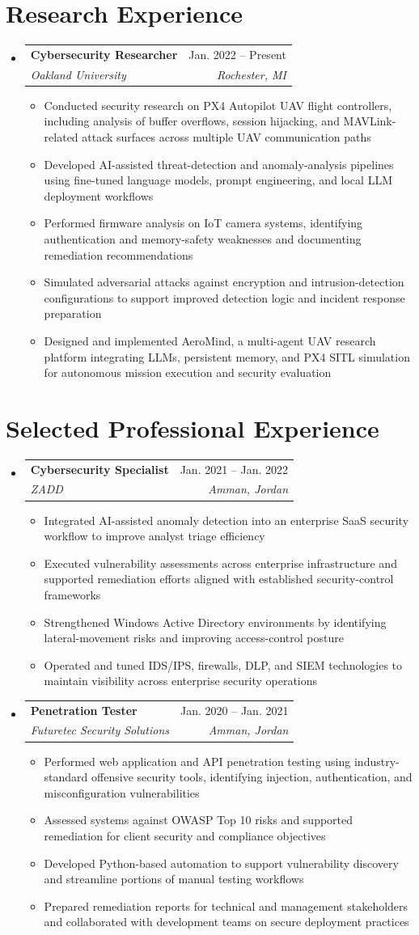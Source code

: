 \documentclass[letterpaper,11pt]{article}
\makeatletter
\newcommand{\resumeItem}[1]{
  \item\small{{#1 \vspace{-2pt}}}
}
\newcommand{\resumeSubheading}[4]{
  \vspace{-2pt}\item
    \begin{tabular*}{0.97\textwidth}[t]{l@{\extracolsep{\fill}}r}
      \textbf{#1} & #2 \\
      \textit{\small#3} & \textit{\small #4} \\
    \end{tabular*}\vspace{-7pt}
}
\newcommand{\resumeSubHeadingListStart}{\begin{itemize}[leftmargin=0.15in, label={}]}
\newcommand{\resumeSubHeadingListEnd}{\end{itemize}}
\newcommand{\resumeItemListStart}{\begin{itemize}}
\newcommand{\resumeItemListEnd}{\end{itemize}\vspace{-5pt}}
\makeatother
\begin{document}
\section{Research Experience}
\resumeSubHeadingListStart
\resumeSubheading
{Cybersecurity Researcher}{Jan. 2022 -- Present}
{Oakland University}{Rochester, MI}
\resumeItemListStart
\resumeItem{Conducted security research on PX4 Autopilot UAV flight controllers, including analysis of buffer overflows, session hijacking, and MAVLink-related attack surfaces across multiple UAV communication paths}
\resumeItem{Developed AI-assisted threat-detection and anomaly-analysis pipelines using fine-tuned language models, prompt engineering, and local LLM deployment workflows}
\resumeItem{Performed firmware analysis on IoT camera systems, identifying authentication and memory-safety weaknesses and documenting remediation recommendations}
\resumeItem{Simulated adversarial attacks against encryption and intrusion-detection configurations to support improved detection logic and incident response preparation}
\resumeItem{Designed and implemented AeroMind, a multi-agent UAV research platform integrating LLMs, persistent memory, and PX4 SITL simulation for autonomous mission execution and security evaluation}
\resumeItemListEnd
\resumeSubHeadingListEnd

\section{Selected Professional Experience}
\resumeSubHeadingListStart
\resumeSubheading
{Cybersecurity Specialist}{Jan. 2021 -- Jan. 2022}
{ZADD}{Amman, Jordan}
\resumeItemListStart
\resumeItem{Integrated AI-assisted anomaly detection into an enterprise SaaS security workflow to improve analyst triage efficiency}
\resumeItem{Executed vulnerability assessments across enterprise infrastructure and supported remediation efforts aligned with established security-control frameworks}
\resumeItem{Strengthened Windows Active Directory environments by identifying lateral-movement risks and improving access-control posture}
\resumeItem{Operated and tuned IDS/IPS, firewalls, DLP, and SIEM technologies to maintain visibility across enterprise security operations}
\resumeItemListEnd

\resumeSubheading
{Penetration Tester}{Jan. 2020 -- Jan. 2021}
{Futuretec Security Solutions}{Amman, Jordan}
\resumeItemListStart
\resumeItem{Performed web application and API penetration testing using industry-standard offensive security tools, identifying injection, authentication, and misconfiguration vulnerabilities}
\resumeItem{Assessed systems against OWASP Top 10 risks and supported remediation for client security and compliance objectives}
\resumeItem{Developed Python-based automation to support vulnerability discovery and streamline portions of manual testing workflows}
\resumeItem{Prepared remediation reports for technical and management stakeholders and collaborated with development teams on secure deployment practices}
\resumeItemListEnd
\resumeSubHeadingListEnd
\end{document}
